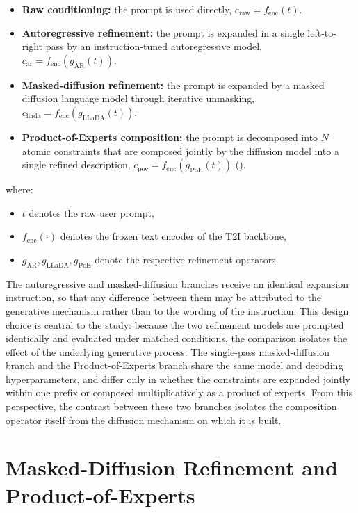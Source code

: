 \documentclass[a4paper,twoside,12pt]{report}
\begin{document}
\begin{itemize}
  \item \textbf{Raw conditioning:} the prompt is used directly,
        \(c_{\mathrm{raw}} = f_{\mathrm{enc}}(t)\).
  \item \textbf{Autoregressive refinement:} the prompt is expanded in a single
        left-to-right pass by an instruction-tuned autoregressive model,
        \(c_{\mathrm{ar}} = f_{\mathrm{enc}}(g_{\mathrm{AR}}(t))\).
  \item \textbf{Masked-diffusion refinement:} the prompt is expanded by a
        masked diffusion language model through iterative unmasking,
        \(c_{\mathrm{llada}} = f_{\mathrm{enc}}(g_{\mathrm{LLaDA}}(t))\).
  \item \textbf{Product-of-Experts composition:} the prompt is decomposed into
        \(N\) atomic constraints that are composed jointly by the diffusion
        model into a single refined description,
        \(c_{\mathrm{poe}} = f_{\mathrm{enc}}(g_{\mathrm{PoE}}(t))\)
        ().
\end{itemize}

where:
\begin{itemize}
  \item \(t\) denotes the raw user prompt,
  \item \(f_{\mathrm{enc}}(\cdot)\) denotes the frozen text encoder of the T2I
        backbone,
  \item \(g_{\mathrm{AR}}, g_{\mathrm{LLaDA}}, g_{\mathrm{PoE}}\) denote the
        respective refinement operators.
\end{itemize}

The autoregressive and masked-diffusion branches receive an identical expansion
instruction, so that any difference between them may be attributed to the
generative mechanism rather than to the wording of the instruction. This design
choice is central to the study: because the two refinement models are prompted
identically and evaluated under matched conditions, the comparison isolates the
effect of the underlying generative process. The single-pass masked-diffusion
branch and the Product-of-Experts branch share the same model and decoding
hyperparameters, and differ only in whether the constraints are expanded
jointly within one prefix or composed multiplicatively as a product of experts.
From this perspective, the contrast between these two branches isolates the
composition operator itself from the diffusion mechanism on which it is built.

\section{Masked-Diffusion Refinement and Product-of-Experts}
\label{sec:llada-math}
\end{document}
